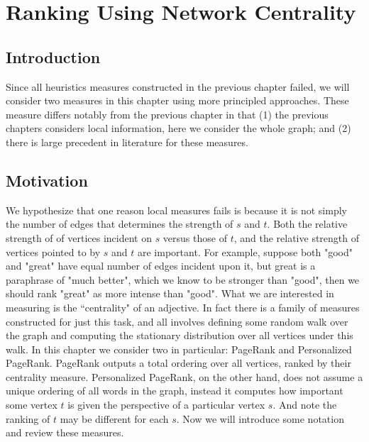 \section{Ranking Using Network Centrality}

\subsection{Introduction}


Since all heuristics measures constructed in the previous chapter failed, we will consider two measures in this chapter using more principled approaches. These measure differs notably from the previous chapter in that (1) the previous chapters considers local information, here we consider the whole graph; and (2) there is large precedent in literature for these measures. 

\subsection{Motivation}

We hypothesize that one reason local measures fails is because it is not simply the number of edges that determines the strength of $s$ and $t$. Both the relative strength of of vertices incident on $s$ versus those of $t$, and the relative strength of vertices pointed to by $s$ and $t$ are important. For example, suppose both "good" and "great" have equal number of edges incident upon it, but great is a paraphrase of "much better", which we know to be stronger than "good", then we should rank "great" as more intense than "good". What we are interested in measuring is the ``centrality" of an adjective. In fact there is a family of measures constructed for just this task, and all involves defining some random walk over the graph and computing the stationary distribution over all vertices under this walk. In this chapter we consider two in particular: PageRank and Personalized PageRank. PageRank outputs a total ordering over all vertices, ranked by their centrality measure. Personalized PageRank, on the other hand, does not assume a unique ordering of all words in the graph, instead it computes how important some vertex $t$ is given the perspective of a particular vertex $s$. And note the ranking of $t$ may be different for each $s$. Now we will introduce some notation and review these measures.

